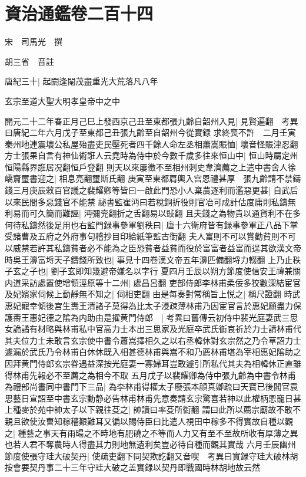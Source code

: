 \section{資治通鑑卷二百十四}
宋　司馬光　撰

胡三省　音註

唐紀三十|{
	起閼逢閹茂盡重光大荒落凡八年}


玄宗至道大聖大明孝皇帝中之中

開元二十二年春正月己巳上發西京己丑至東都張九齡自韶州入見|{
	見賢遍翻　考異曰唐紀二年六月戊子至東都己丑張九齡至自韶州今從實録}
求終喪不許　二月壬寅秦州地連震壞公私屋殆盡吏民壓死者四千餘人命左丞相蕭嵩賑恤|{
	壞音怪賑津忍翻}
方士張果自言有神仙術誑人云堯時為侍中於今數千歲多往來恒山中|{
	恒山時屬定州恒陽縣界誑居况翻恒戶登翻}
則天以來屢徵不至相州刺史韋濟薦之上遣中書舍人徐嶠齎璽書迎之|{
	相息亮翻璽斯氏翻}
庚寅至東都肩輿入宫恩禮甚厚　張九齡請不禁鑄錢三月庚辰敕百官議之裴耀卿等皆曰一啟此門恐小人棄農逐利而濫惡更甚|{
	自武后以來民間多惡錢官不能禁}
祕書監崔沔曰若稅銅折役則官冶可成計估度庸則私鑄無利易而可久簡而難誣|{
	沔彌兖翻折之舌翻易以䜴翻}
且夫錢之為物貴以通貨利不在多何待私鑄然後足用也右監門録事參軍劉秩曰|{
	唐十六衛府皆有録事參軍正八品下掌受諸曹及五府之外府事句稽抄目印給紙筆監古衘翻}
夫人富則不可以賞勸貧則不可以威禁若許其私鑄貧者必不能為之臣恐貧者益貧而役於富富者益富而逞其欲漢文帝時吳王濞富埓天子鑄錢所致也|{
	事見十四卷漢文帝五年濞匹備翻埒力輟翻}
上乃止秩子玄之子也|{
	劉子玄即知幾避帝嫌名以字行}
夏四月壬辰以朔方節度使信安王禕兼關内道采訪處置使增領涇原等十二州|{
	處昌呂翻}
吏部侍郎李林甫柔佞多狡數深結宦官及妃嬪家伺候上動靜無不知之|{
	伺相吏翻}
由是每奏對常稱旨上悦之|{
	稱尺證翻}
時武惠妃寵幸傾後宫生夀王清諸子莫得為比太子浸疎薄林甫乃因宦官言於惠妃願盡力保護夀王惠妃德之隂為内助由是擢黄門侍郎　|{
	考異曰舊傳云初侍中裴光庭妻武三思女詭譎有材略與林甫私中官高力士本出三思家及光庭卒武氏衘哀祈於力士請林甫代其夫位力士未敢言玄宗使中書令蕭嵩擇相久之以右丞韓休對玄宗然之乃令草詔力士遽漏於武氏乃令林甫白休休既入相甚德林甫與嵩不和乃薦林甫堪為宰相惠妃隂助之因拜黄門侍郎玄宗眷遇益深按光庭妻一寡婦耳豈敢遽引所私代其夫為相韓休正直雖得林甫先報必不至薦之為相今不取}
五月戊子以裴耀卿為侍中張九齡為中書令林甫為禮部尚書同中書門下三品|{
	為李林甫得權太子廢張本顔真卿疏曰天寶已後閻官袁思藝日宣詔至中書玄宗動静必告林甫林甫先意奏請玄宗驚喜若神以此權柄恩寵日甚}
上種麥於苑中帥太子以下親往芟之|{
	帥讀曰率芟所衘翻}
謂曰此所以薦宗廟故不敢不親且欲使汝曹知稼穡艱難耳又徧以賜侍臣曰比遣人視田中稼多不得實故自種以觀之|{
	種藝之事天有雨暘之不時地有肥磽之不等而人力又有至不至故所收有厚薄之異也若人君不奪農時人得盡其力則地無遺利矣豈必待自種而觀其實哉}
六月壬辰幽州節度使張守珪大破契丹|{
	使疏吏翻下同契欺訖翻又音喫　考異曰實録守珪大破林胡按會要契丹事二十三年守珪大破之盖實録以契丹即戰國時林胡地故云然}
